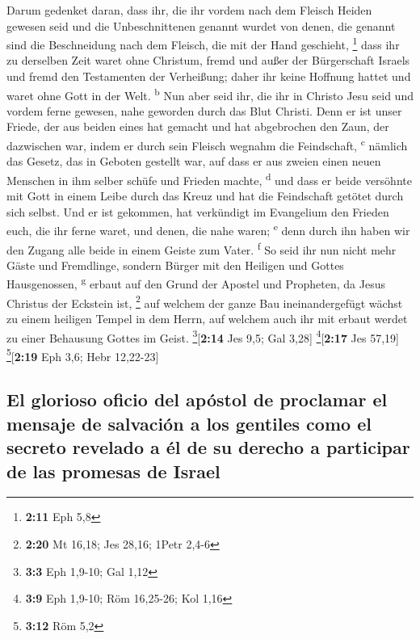  Darum gedenket daran, dass ihr, die ihr vordem nach dem
Fleisch Heiden gewesen seid und die Unbeschnittenen genannt wurdet von
denen, die genannt sind die Beschneidung nach dem Fleisch, die mit der
Hand geschieht, \footnote{\textbf{2:11} Eph 5,8}  dass
ihr zu derselben Zeit waret ohne Christum, fremd und außer der
Bürgerschaft Israels und fremd den Testamenten der Verheißung; daher ihr
keine Hoffnung hattet und waret ohne Gott in der Welt.
\textsuperscript{b}  Nun aber seid ihr, die ihr in
Christo Jesu seid und vordem ferne gewesen, nahe geworden durch das Blut
Christi.  Denn er ist unser Friede, der aus beiden eines
hat gemacht und hat abgebrochen den Zaun, der dazwischen war, indem er
durch sein Fleisch wegnahm die Feindschaft, \textsuperscript{c}
 nämlich das Gesetz, das in Geboten gestellt war, auf
dass er aus zweien einen neuen Menschen in ihm selber schüfe und Frieden
machte, \textsuperscript{d}  und dass er beide versöhnte
mit Gott in einem Leibe durch das Kreuz und hat die Feindschaft getötet
durch sich selbst.  Und er ist gekommen, hat verkündigt
im Evangelium den Frieden euch, die ihr ferne waret, und denen, die nahe
waren; \textsuperscript{e}  denn durch ihn haben wir den
Zugang alle beide in einem Geiste zum Vater. \textsuperscript{f}
 So seid ihr nun nicht mehr Gäste und Fremdlinge, sondern
Bürger mit den Heiligen und Gottes Hausgenossen, \textsuperscript{g}
 erbaut auf den Grund der Apostel und Propheten, da Jesus
Christus der Eckstein ist, \footnote{\textbf{2:20} Mt 16,18; Jes 28,16;
  1Petr 2,4-6}  auf welchem der ganze Bau
ineinandergefügt wächst zu einem heiligen Tempel in dem Herrn,
 auf welchem auch ihr mit erbaut werdet zu einer
Behausung Gottes im Geist. \footnote{\textbf{3:3} Eph 1,9-10; Gal 1,12}{[}\textbf{2:14}
Jes 9,5; Gal 3,28{]} \footnote{\textbf{3:9} Eph 1,9-10; Röm 16,25-26;
  Kol 1,16}{[}\textbf{2:17} Jes 57,19{]} \footnote{\textbf{3:12} Röm 5,2}{[}\textbf{2:19}
Eph 3,6; Hebr 12,22-23{]}

\hypertarget{el-glorioso-oficio-del-apuxf3stol-de-proclamar-el-mensaje-de-salvaciuxf3n-a-los-gentiles-como-el-secreto-revelado-a-uxe9l-de-su-derecho-a-participar-de-las-promesas-de-israel}{%
\subsection{El glorioso oficio del apóstol de proclamar el mensaje de
salvación a los gentiles como el secreto revelado a él de su derecho a
participar de las promesas de
Israel}\label{el-glorioso-oficio-del-apuxf3stol-de-proclamar-el-mensaje-de-salvaciuxf3n-a-los-gentiles-como-el-secreto-revelado-a-uxe9l-de-su-derecho-a-participar-de-las-promesas-de-israel}}

